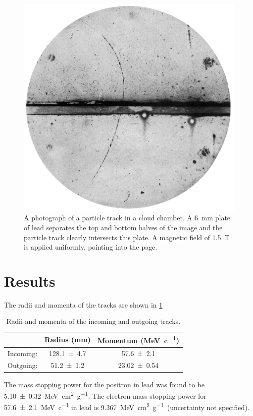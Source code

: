 \documentclass[11pt]{article}
\numberwithin{equation}{section}
\numberwithin{figure}{section}
\numberwithin{table}{section}
\begin{document}
\begin{figure}[h]
    \begin{center}
        \includegraphics[width=.5\textwidth]{Plots/positron_track.jpg}
        \caption{A photograph of a particle track in a cloud chamber. A \SI{6}{\milli\metre} plate of lead separates the top and bottom halves of the image and the particle track clearly intersects this plate. A magnetic field of \SI{1.5}{\tesla} is applied uniformly, pointing into the page. \cite{Pos_Electron}}
        \label{fig:positron_track}
    \end{center}
\end{figure}


\section{Results}\label{sec:Results}
The radii and momenta of the tracks are shown in \cref{tbl:results}

\begin{table}[H]
    \centering
    \begin{tabular}{c||c|c}
         & Radius (\si[]{\milli\metre}) & Momentum (\si[]{\mega\electronvolt\per c})\\ \hline
        Incoming: & \num{128.1\pm4.7} & \num{57.6\pm2.1} \\
        Outgoing: & \num{51.2\pm1.2} & \num{23.02\pm0.54}
    \end{tabular}
    \caption{Radii and momenta of the incoming and outgoing tracks.}
    \label{tbl:results}
\end{table}

The mass stopping power for the positron in lead was found to be \SI{5.10\pm0.32}{\mega\electronvolt\centi\metre\squared\per\gram}. The electron mass stopping power for \SI{57.6\pm2.1}{\mega\electronvolt\per c} in lead is \SI{9.367}{\mega\electronvolt\centi\metre\squared\per\gram}~\cite{NIST_ESTAR}(uncertainty not specified). 
\end{document}
